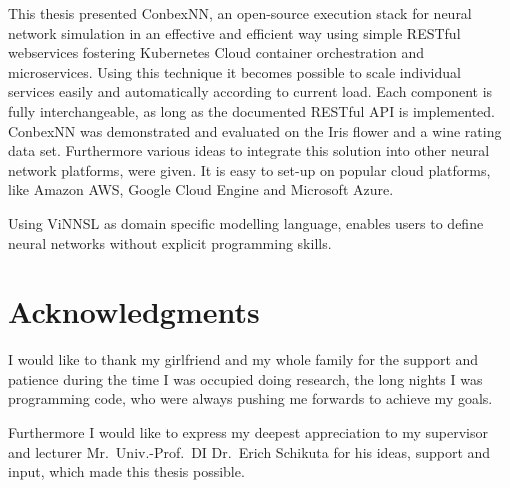This thesis presented ConbexNN, an open-source execution stack for
neural network simulation in an effective and efficient way using simple
RESTful webservices fostering Kubernetes Cloud container orchestration
and microservices. Using this technique it becomes possible to scale
individual services easily and automatically according to current load.
Each component is fully interchangeable, as long as the documented
RESTful API is implemented. ConbexNN was demonstrated and evaluated on
the Iris flower and a wine rating data set. Furthermore various ideas to
integrate this solution into other neural network platforms, were given.
It is easy to set-up on popular cloud platforms, like Amazon AWS, Google
Cloud Engine and Microsoft Azure.

Using ViNNSL as domain specific modelling language, enables users to
define neural networks without explicit programming skills.

\chapter{Acknowledgments}\label{acknowledgments}

I would like to thank my girlfriend and my whole family for the support
and patience during the time I was occupied doing research, the long
nights I was programming code, who were always pushing me forwards to
achieve my goals.

Furthermore I would like to express my deepest appreciation to my
supervisor and lecturer Mr.~Univ.-Prof.~DI Dr.~Erich Schikuta for his
ideas, support and input, which made this thesis possible.
